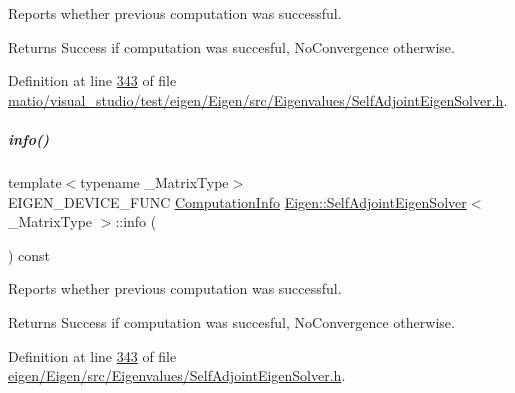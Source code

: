 Reports whether previous computation was successful. 

\begin{DoxyReturn}{Returns}
{\ttfamily Success} if computation was succesful, {\ttfamily No\+Convergence} otherwise. 
\end{DoxyReturn}


Definition at line \hyperlink{matio_2visual__studio_2test_2eigen_2_eigen_2src_2_eigenvalues_2_self_adjoint_eigen_solver_8h_source_l00343}{343} of file \hyperlink{matio_2visual__studio_2test_2eigen_2_eigen_2src_2_eigenvalues_2_self_adjoint_eigen_solver_8h_source}{matio/visual\+\_\+studio/test/eigen/\+Eigen/src/\+Eigenvalues/\+Self\+Adjoint\+Eigen\+Solver.\+h}.

\mbox{\label{group___eigenvalues___module_a56bd59b85a6f6f00ff7bff307ad0e015}} 
\subparagraph{\texorpdfstring{info()}{info()}\hspace{0.1cm}{\footnotesize\ttfamily [2/2]}}
{\footnotesize\ttfamily template$<$typename \+\_\+\+Matrix\+Type$>$ \\
E\+I\+G\+E\+N\+\_\+\+D\+E\+V\+I\+C\+E\+\_\+\+F\+U\+NC \hyperlink{group__enums_ga85fad7b87587764e5cf6b513a9e0ee5e}{Computation\+Info} \hyperlink{group___eigenvalues___module_class_eigen_1_1_self_adjoint_eigen_solver}{Eigen\+::\+Self\+Adjoint\+Eigen\+Solver}$<$ \+\_\+\+Matrix\+Type $>$\+::info (\begin{DoxyParamCaption}{ }\end{DoxyParamCaption}) const\hspace{0.3cm}{\ttfamily [inline]}}



Reports whether previous computation was successful. 

\begin{DoxyReturn}{Returns}
{\ttfamily Success} if computation was succesful, {\ttfamily No\+Convergence} otherwise. 
\end{DoxyReturn}


Definition at line \hyperlink{eigen_2_eigen_2src_2_eigenvalues_2_self_adjoint_eigen_solver_8h_source_l00343}{343} of file \hyperlink{eigen_2_eigen_2src_2_eigenvalues_2_self_adjoint_eigen_solver_8h_source}{eigen/\+Eigen/src/\+Eigenvalues/\+Self\+Adjoint\+Eigen\+Solver.\+h}.

